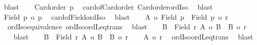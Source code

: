 \begin{isabellebody}
\ blast\isanewline
\ \ \isamarkupfalse%
\ {\isachardoublequoteopen}Card{\isacharunderscore}{\kern0pt}order\ p{\isachardoublequoteclose}\ \isamarkupfalse%
\ card{\isacharunderscore}{\kern0pt}of{\isacharunderscore}{\kern0pt}Card{\isacharunderscore}{\kern0pt}order\ Card{\isacharunderscore}{\kern0pt}order{\isacharunderscore}{\kern0pt}ordIso{}\ \isamarkupfalse%
\ blast\isanewline
\ \ \isamarkupfalse%
\ {\isachardoublequoteopen}{\isacharbar}{\kern0pt}Field\ p{\isacharbar}{\kern0pt}\ {\isacharequal}{\kern0pt}o\ p{\isachardoublequoteclose}\ \isamarkupfalse%
\ card{\isacharunderscore}{\kern0pt}of{\isacharunderscore}{\kern0pt}Field{\isacharunderscore}{\kern0pt}ordIso\ \isamarkupfalse%
\ blast\isanewline
\ \ \isamarkupfalse%
\ {\isachardoublequoteopen}{\isacharbar}{\kern0pt}A{\isacharbar}{\kern0pt}\ {\isacharequal}{\kern0pt}o\ {\isacharbar}{\kern0pt}Field\ p{\isacharbar}{\kern0pt}\ {\isasymand}\ {\isacharbar}{\kern0pt}Field\ p{\isacharbar}{\kern0pt}\ {\isasymle}o\ r{\isachardoublequoteclose}\isanewline
\ \ \isamarkupfalse%
\ {}\ ordIso{\isacharunderscore}{\kern0pt}equivalence\ ordIso{\isacharunderscore}{\kern0pt}ordLeq{\isacharunderscore}{\kern0pt}trans\ \isamarkupfalse%
\ blast\isanewline
\ \ \isamarkupfalse%
\ {\isachardoublequoteopen}{\isasymexists}B\ {\isasymle}\ Field\ r{\isachardot}{\kern0pt}\ {\isacharbar}{\kern0pt}A{\isacharbar}{\kern0pt}\ {\isacharequal}{\kern0pt}o\ {\isacharbar}{\kern0pt}B{\isacharbar}{\kern0pt}\ {\isasymand}\ {\isacharbar}{\kern0pt}B{\isacharbar}{\kern0pt}\ {\isasymle}o\ r{\isachardoublequoteclose}\ \isamarkupfalse%
\ {}\ \isamarkupfalse%
\ blast\isanewline
{}\isamarkupfalse%
\isanewline
\ \ \isamarkupfalse%
\ {\isachardoublequoteopen}{\isasymexists}B\ {\isasymle}\ Field\ r{\isachardot}{\kern0pt}\ {\isacharbar}{\kern0pt}A{\isacharbar}{\kern0pt}\ {\isacharequal}{\kern0pt}o\ {\isacharbar}{\kern0pt}B{\isacharbar}{\kern0pt}\ {\isasymand}\ {\isacharbar}{\kern0pt}B{\isacharbar}{\kern0pt}\ {\isasymle}o\ r{\isachardoublequoteclose}\isanewline
\ \ \isamarkupfalse%
\ {\isachardoublequoteopen}{\isacharbar}{\kern0pt}A{\isacharbar}{\kern0pt}\ {\isasymle}o\ r{\isachardoublequoteclose}\ \isamarkupfalse%
\ ordIso{\isacharunderscore}{\kern0pt}ordLeq{\isacharunderscore}{\kern0pt}trans\ \isamarkupfalse%
\ blast\isanewline
{}\isamarkupfalse%

\end{isabellebody}
